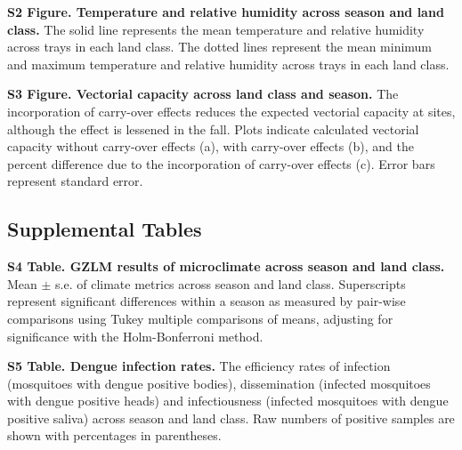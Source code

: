 \documentclass[12pt]{article}
\begin{document}
\textbf{S2 Figure. Temperature and relative humidity across season and land class.} The solid line represents the mean temperature and relative humidity across trays in each land class. The dotted lines represent the mean minimum and maximum temperature and relative humidity across trays in each land class.

\textbf{S3 Figure. Vectorial capacity across land class and season.} The incorporation of carry-over effects reduces the expected vectorial capacity at sites, although the effect is lessened in the fall. Plots indicate calculated vectorial capacity without carry-over effects (a), with carry-over effects (b), and the percent difference due to the incorporation of carry-over effects (c). Error bars represent standard error.

\subsection{Supplemental Tables}

\textbf{S4 Table. GZLM results of microclimate across season and land class.} Mean $\pm$ s.e. of climate metrics across season and land class. Superscripts represent significant differences within a season as measured by pair-wise comparisons using Tukey multiple comparisons of means, adjusting for significance with the Holm-Bonferroni method.

\textbf{S5 Table. Dengue infection rates.} The efficiency rates of infection (mosquitoes with dengue positive bodies), dissemination (infected mosquitoes with dengue positive heads) and infectiousness (infected mosquitoes with dengue positive saliva) across season and land class. Raw numbers of positive samples are shown with percentages in parentheses.

\newpage



\end{document}
